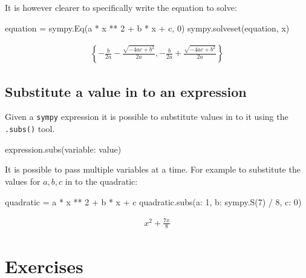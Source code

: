 \begin{pyin}
It is however clearer to specifically write the equation to solve:

\begin{pyin}
equation = sympy.Eq(a * x ** 2 + b * x + c, 0)
sympy.solveset(equation, x)
\end{pyin}




\begin{equation*}
\begin{split}\displaystyle \left\{- \frac{b}{2 a} - \frac{\sqrt{- 4 a c + b^{2}}}{2 a}, - \frac{b}{2 a} + \frac{\sqrt{- 4 a c + b^{2}}}{2 a}\right\}\end{split}
\end{equation*}




\subsection{Substitute a value in to an expression}
\label{sec:substite_a_value_in_to_an_expression}

Given a \texttt{sympy} expression it is possible to substitute values in to it using
the \texttt{.subs()} tool.

\begin{pyin}
expression.subs({variable: value})
\end{pyin}

It is possible to pass multiple variables at a time.
For example to substitute the values for \(a, b, c\) in to the quadratic:

\begin{pyin}
quadratic = a * x ** 2 + b * x + c
quadratic.subs({a: 1, b: sympy.S(7) / 8, c: 0})
\end{pyin}

\begin{equation*}
\begin{split}\displaystyle x^{2} + \frac{7 x}{8}\end{split}
\end{equation*}

\section{Exercises}


\end{pyin}
